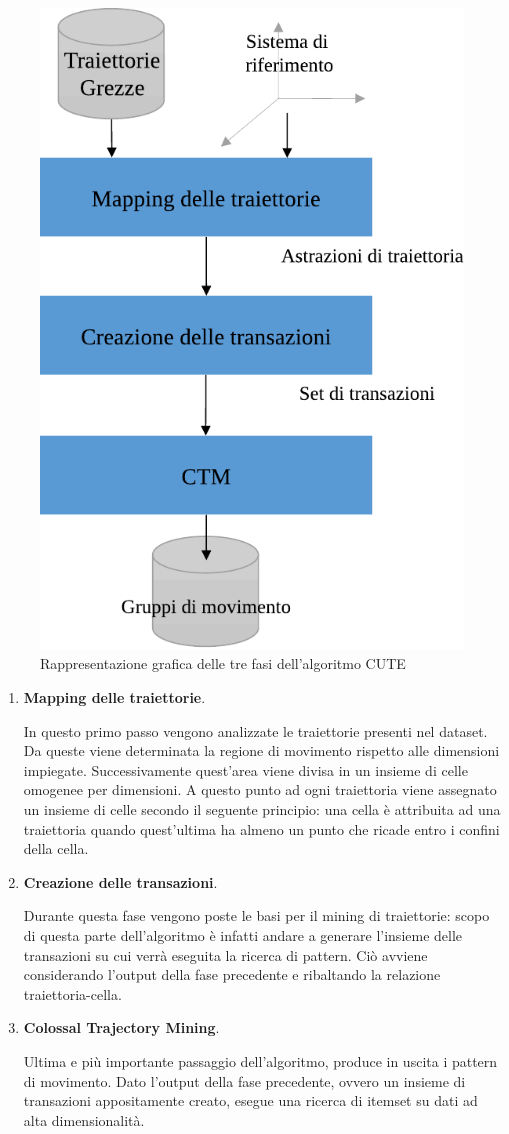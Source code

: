   \begin{figure}
    \centering
    \includegraphics[width=.6\textwidth]{res/fig/sec-3/CUTEFlow.pdf}
    \caption{Rappresentazione grafica delle tre fasi dell'algoritmo CUTE}%
    \label{fig:chap-3:cute-overview}
  \end{figure}

  \begin{enumerate}
    \item \textbf{Mapping delle traiettorie}.

    In questo primo passo vengono analizzate le traiettorie presenti nel dataset. Da queste viene determinata la regione di movimento rispetto alle dimensioni impiegate.
    Successivamente quest'area viene divisa in un insieme di celle omogenee per dimensioni.
    A questo punto ad ogni traiettoria viene assegnato un insieme di celle secondo il seguente principio: una cella è attribuita ad una traiettoria quando quest'ultima ha
    almeno un punto che ricade entro i confini della cella.

    \item  \textbf{Creazione delle transazioni}.

    Durante questa fase vengono poste le basi per il mining di traiettorie: scopo di questa parte dell'algoritmo
    è infatti andare a generare l'insieme delle transazioni su cui verrà eseguita la ricerca di pattern.
    Ciò avviene considerando l'output della fase precedente e ribaltando la relazione traiettoria-cella.

    \item \textbf{Colossal Trajectory Mining}.

    Ultima e più importante passaggio dell'algoritmo, produce in uscita i pattern di movimento.
    Dato l'output della fase precedente, ovvero un insieme di transazioni appositamente creato,
    esegue una ricerca di itemset su dati ad alta dimensionalità.

  \end{enumerate}





